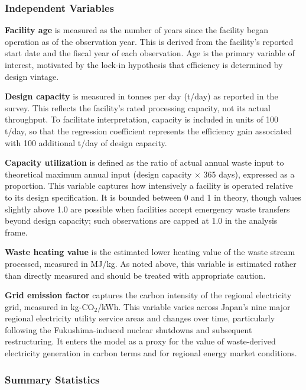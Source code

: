 \documentclass[12pt,a4paper]{article}
\begin{document}
\subsubsection{Independent Variables}

\textbf{Facility age} is measured as the number of years since the facility began operation as of the observation year. This is derived from the facility's reported start date and the fiscal year of each observation. Age is the primary variable of interest, motivated by the lock-in hypothesis that efficiency is determined by design vintage.

\textbf{Design capacity} is measured in tonnes per day (t/day) as reported in the survey. This reflects the facility's rated processing capacity, not its actual throughput. To facilitate interpretation, capacity is included in units of 100 t/day, so that the regression coefficient represents the efficiency gain associated with 100 additional t/day of design capacity.

    \textbf{Capacity utilization} is defined as the ratio of actual annual waste input to theoretical maximum annual input (design capacity $\times$ 365 days), expressed as a proportion. This variable captures how intensively a facility is operated relative to its design specification. It is bounded between 0 and 1 in theory, though values slightly above 1.0 are possible when facilities accept emergency waste transfers beyond design capacity; such observations are capped at 1.0 in the analysis frame.

\textbf{Waste heating value} is the estimated lower heating value of the waste stream processed, measured in MJ/kg. As noted above, this variable is estimated rather than directly measured and should be treated with appropriate caution.

\textbf{Grid emission factor} captures the carbon intensity of the regional electricity grid, measured in kg-CO$_2$/kWh. This variable varies across Japan's nine major regional electricity utility service areas and changes over time, particularly following the Fukushima-induced nuclear shutdowns and subsequent restructuring. It enters the model as a proxy for the value of waste-derived electricity generation in carbon terms and for regional energy market conditions.

\subsubsection{Summary Statistics}
\end{document}
